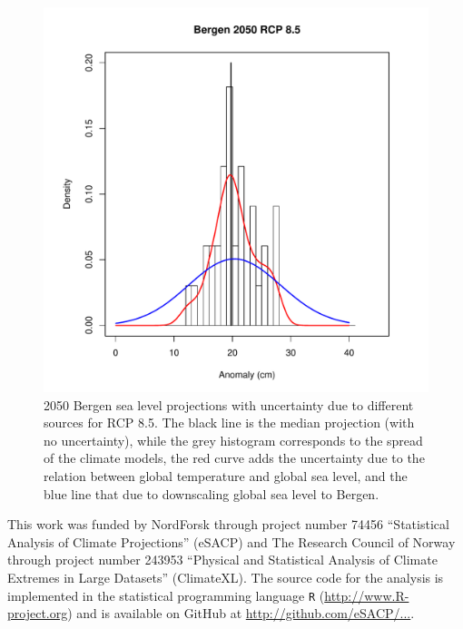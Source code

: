 \documentclass[draft,linenumbers]{agujournal}
\begin{document}
\begin{figure}[!hbpt]
\begin{center}
\includegraphics[width=\linewidth]{unc.pdf}
\caption{2050 Bergen sea level projections with uncertainty due to different sources for RCP 8.5. The black line is the median projection (with no uncertainty), while the grey histogram corresponds to the spread of the climate models, the red curve adds the uncertainty due to the relation between global temperature and global sea level, and the blue line that due to downscaling global sea level to Bergen. } 
\label{fig:unc}
\end{center}
\end{figure}





\begin{acknowledgments}
This work was funded by NordForsk through project number 74456 ``Statistical Analysis of Climate Projections'' (eSACP) and The Research Council of Norway through project number 243953 ``Physical and Statistical Analysis of Climate Extremes in Large Datasets'' (ClimateXL). The source code for the analysis is implemented in the statistical programming language {\tt R} (\url{http://www.R-project.org}) and is available on GitHub at \url{http://github.com/eSACP/...}.
\end{acknowledgments}
\end{document}
